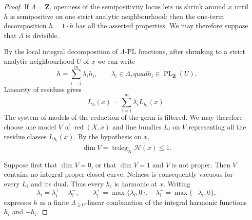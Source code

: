 \begin{proof}
If $\Lambda=\mathbf Z$, openness of the semipositivity locus lets us shrink
around $x$ until $h$ is semipositive on one strict analytic neighbourhood;
then the one-term decomposition $h=1\cdot h$ has all the asserted
properties.  We may therefore suppose that $\Lambda$ is divisible.

By the local integral decomposition of $\Lambda$-PL functions, after
shrinking to a strict analytic neighbourhood $U$ of $x$ we can write
\[
                         h=\sum_{i=1}^m\lambda_i h_i,
 \qquad \lambda_i\in\Lambda,quad h_i\in\operatorname{PL}_{\mathbf Z}(U).
\]
Linearity of residues gives
\[
                         L_h(x)=\sum_{i=1}^m\lambda_iL_{h_i}(x).
\]
The system of models of the reduction of the germ is filtered.  We may
therefore choose one model $V$ of $\operatorname{red}(X,x)$ and line bundles
$L_i$ on $V$ representing all the residue classes $L_{h_i}(x)$.  By the
hypothesis on $x$,
\[
        \dim V=\operatorname{trdeg}_{\widetilde K}
                    \widetilde{\mathscr H(x)}\leq1.
\]

Suppose first that $\dim V=0$, or that $\dim V=1$ and $V$ is not proper.
Then $V$ contains no integral proper closed curve.  Nefness is consequently
vacuous for every $L_i$ and its dual.  Thus every $h_i$ is harmonic at $x$.
Writing
\[
          \lambda_i=\lambda_i^+-\lambda_i^-,\qquad
          \lambda_i^+=\max\{\lambda_i,0\},\quad
          \lambda_i^-=\max\{-\lambda_i,0\},
\]
expresses $h$ as a finite $\Lambda_{\geq0}$-linear combination of the
integral harmonic functions $h_i$ and $-h_i$.


\end{proof}
